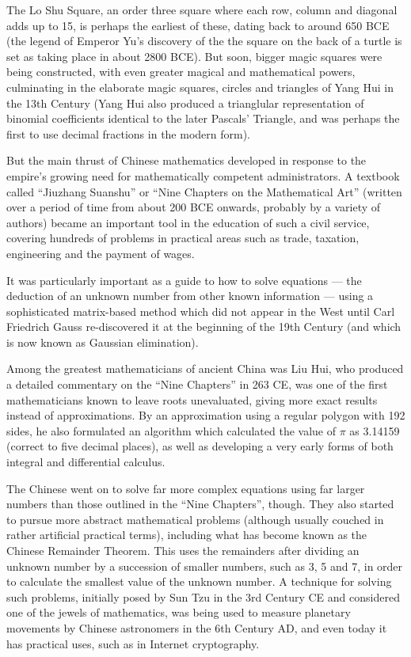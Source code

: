 The Lo Shu Square, an order three square where each row, column and diagonal adds up to 15, is perhaps the earliest of these, dating back to around 650 BCE (the legend of Emperor Yu’s discovery of the the square on the back of a turtle is set as taking place in about 2800 BCE). But soon, bigger magic squares were being constructed, with even greater magical and mathematical powers, culminating in the elaborate magic squares, circles and triangles of Yang Hui in the 13th Century (Yang Hui also produced a trianglular representation of binomial coefficients identical to the later Pascals’ Triangle, and was perhaps the first to use decimal fractions in the modern form).

But the main thrust of Chinese mathematics developed in response to the empire’s growing need for mathematically competent administrators. A textbook called ``Jiuzhang Suanshu'' or ``Nine Chapters on the Mathematical Art'' (written over a period of time from about 200 BCE onwards, probably by a variety of authors) became an important tool in the education of such a civil service, covering hundreds of problems in practical areas such as trade, taxation, engineering and the payment of wages.

It was particularly important as a guide to how to solve equations --- the deduction of an unknown number from other known information --- using a sophisticated matrix-based method which did not appear in the West until Carl Friedrich Gauss re-discovered it at the beginning of the 19th Century (and which is now known as Gaussian elimination).

Among the greatest mathematicians of ancient China was Liu Hui, who produced a detailed commentary on the ``Nine Chapters'' in 263 CE, was one of the first mathematicians known to leave roots unevaluated, giving more exact results instead of approximations. By an approximation using a regular polygon with 192 sides, he also formulated an algorithm which calculated the value of $ \pi $ as 3.14159 (correct to five decimal places), as well as developing a very early forms of both integral and differential calculus.

The Chinese went on to solve far more complex equations using far larger numbers than those outlined in the ``Nine Chapters'', though. They also started to pursue more abstract mathematical problems (although usually couched in rather artificial practical terms), including what has become known as the Chinese Remainder Theorem. This uses the remainders after dividing an unknown number by a succession of smaller numbers, such as 3, 5 and 7, in order to calculate the smallest value of the unknown number. A technique for solving such problems, initially posed by Sun Tzu in the 3rd Century CE and considered one of the jewels of mathematics, was being used to measure planetary movements by Chinese astronomers in the 6th Century AD, and even today it has practical uses, such as in Internet cryptography.


